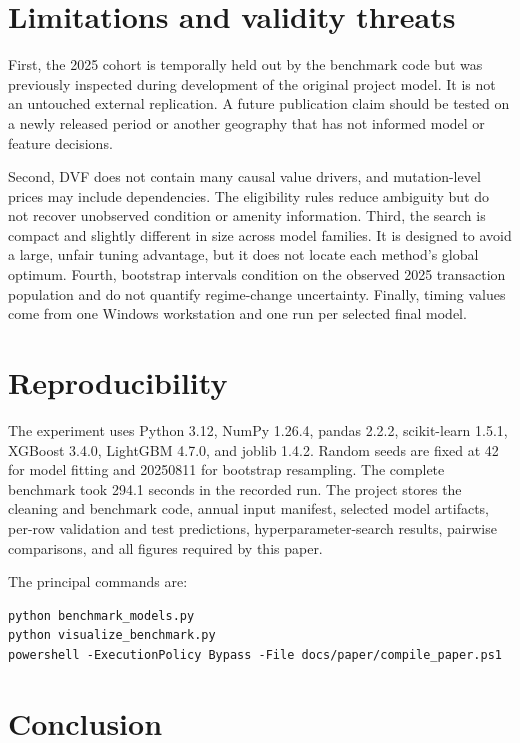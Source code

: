 \documentclass[11pt,a4paper]{article}
\begin{document}
\section{Limitations and validity threats}

First, the 2025 cohort is temporally held out by the benchmark code but was
previously inspected during development of the original project model. It is not
an untouched external replication. A future publication claim should be tested
on a newly released period or another geography that has not informed model or
feature decisions.

Second, DVF does not contain many causal value drivers, and mutation-level prices
may include dependencies. The eligibility rules reduce ambiguity but do not
recover unobserved condition or amenity information. Third, the search is compact
and slightly different in size across model families. It is designed to avoid a
large, unfair tuning advantage, but it does not locate each method's global
optimum. Fourth, bootstrap intervals condition on the observed 2025 transaction
population and do not quantify regime-change uncertainty. Finally, timing values
come from one Windows workstation and one run per selected final model.

\section{Reproducibility}

The experiment uses Python 3.12, NumPy 1.26.4, pandas 2.2.2, scikit-learn 1.5.1,
XGBoost 3.4.0, LightGBM 4.7.0, and joblib 1.4.2. Random seeds are fixed at 42 for
model fitting and 20250811 for bootstrap resampling. The complete benchmark took
294.1 seconds in the recorded run. The project stores the cleaning and benchmark
code, annual input manifest, selected model artifacts, per-row validation and
test predictions, hyperparameter-search results, pairwise comparisons, and all
figures required by this paper.

The principal commands are:
\begin{verbatim}
python benchmark_models.py
python visualize_benchmark.py
powershell -ExecutionPolicy Bypass -File docs/paper/compile_paper.ps1
\end{verbatim}

\section{Conclusion}
\end{document}
